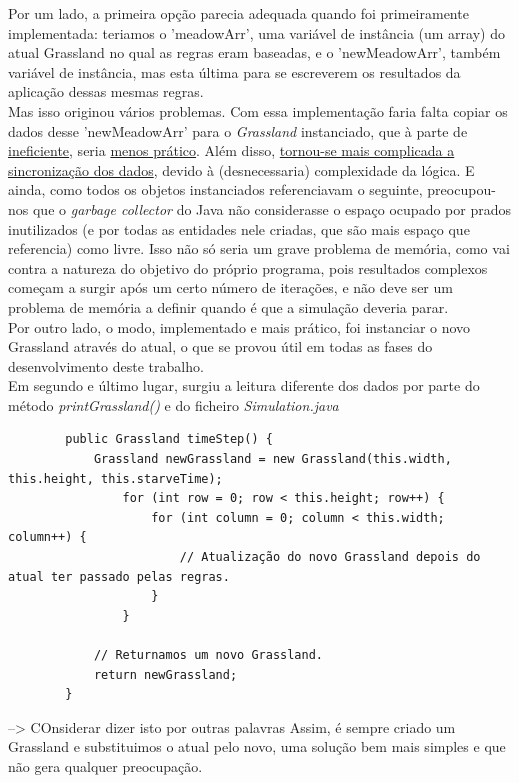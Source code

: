 \documentclass {report}
\begin{document}
	Por um lado, a primeira opção parecia adequada quando foi primeiramente implementada: teriamos o 'meadowArr', uma variável de instância (um array) do atual Grassland no qual as regras eram baseadas, 
	e o 'newMeadowArr', também variável de instância, mas esta última para se escreverem os resultados da aplicação dessas mesmas regras. \\ Mas isso originou vários problemas.
	Com essa implementação faria falta copiar os dados desse 'newMeadowArr' para o \textit{Grassland} instanciado, que à parte de \underline{ineficiente}, seria \underline{menos prático}. 
	Além disso, \underline{tornou-se mais complicada a sincronização dos dados}, devido à (desnecessaria) complexidade da lógica. 
	E ainda, como todos os objetos instanciados referenciavam o seguinte, preocupou-nos que o \textit{garbage collector} do Java
	não considerasse o espaço ocupado por prados inutilizados (e por todas as entidades nele criadas, que são mais espaço que referencia) como livre. 
	Isso não só seria um grave problema de memória, como vai contra a natureza do objetivo do próprio programa, pois resultados complexos começam a surgir após
	um certo número de iterações, e não deve ser um problema de memória a definir quando é que a simulação deveria parar.\\

	Por outro lado, o modo, implementado e mais prático, foi instanciar o novo Grassland através do atual, 
	o que se provou útil em todas as fases do desenvolvimento deste trabalho.\\

	Em segundo e último lugar, surgiu a leitura diferente dos dados por parte do método \textit{printGrassland()} e do ficheiro \textit{Simulation.java}
	
	\begin{verbatim}
		public Grassland timeStep() {
			Grassland newGrassland = new Grassland(this.width, this.height, this.starveTime);
				for (int row = 0; row < this.height; row++) {
					for (int column = 0; column < this.width; column++) {
						// Atualização do novo Grassland depois do atual ter passado pelas regras.
					}
				}
			
			// Returnamos um novo Grassland.
			return newGrassland;
		}
	\end{verbatim}

	--> COnsiderar dizer isto por outras palavras
	Assim, é sempre criado um Grassland e substituimos o atual pelo novo, uma solução
	bem mais simples e que não gera qualquer preocupação.
\end{document}
